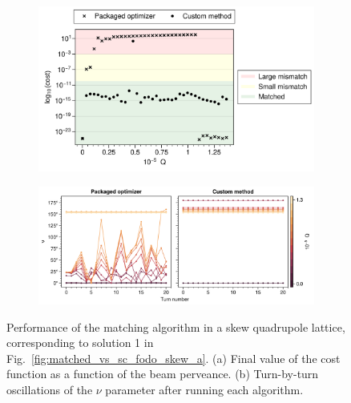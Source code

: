 \begin{figure}[!p]
    \centering
    \begin{subfigure}{0.8\textwidth}
        \includegraphics[width=\textwidth]{Images/chapter2/optimizer_comparison_costfunc.png}
        \caption{}
        \label{fig:optimizer_comparison_a}
    \end{subfigure}
    \vfill
    \vspace*{1cm}
    \vfill
    \begin{subfigure}{1.0\textwidth}
        \includegraphics[width=\textwidth]{Images/chapter2/optimizer_comparison_tbt.png}
        \caption{}
        \label{fig:optimizer_comparison_b}
    \end{subfigure}
    \caption{Performance of the matching algorithm in a skew quadrupole lattice, corresponding to solution 1 in Fig.~\ref{fig:matched_vs_sc_fodo_skew_a}. (a) Final value of the cost function as a function of the beam perveance. (b) Turn-by-turn oscillations of the $\nu$ parameter after running each algorithm.}
    \label{fig:optimizer_comparison}
\end{figure}
%
